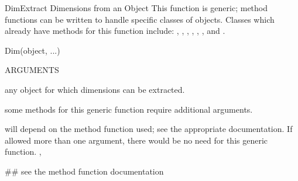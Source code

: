 \documentclass[pdftex]{article} \usepackage{url,graphicx}
\begin{document}
\begin{Helpfile}{Dim}{Extract Dimensions from an Object}
This function is generic; method functions can be written to handle
specific classes of objects. Classes which already have methods for
this function include: , ,
, , , ,
and .
\begin{Example}
Dim(object, ...)
\end{Example}
\begin{Argument}{ARGUMENTS}
\item[\Co{object:}]
any object for which dimensions can be extracted.
\item[\Co{...:}]
some methods for this generic function require additional
arguments.
\end{Argument}
will depend on the method function used; see the appropriate documentation.
 If  allowed more than one argument, there would be no
need for this generic function.
, 
\need 15pt
\vspace{-16pt} 
\begin{Example}
## see the method function documentation
\end{Example}
\end{Helpfile}
\end{document}
